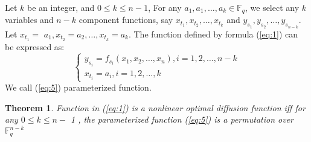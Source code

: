 \documentclass[12pt,a4paper]{article}
\newcommand{\0}{\textbf{0}}
\newcommand{\1}{\textbf{1}}
\newtheorem{theorem}{Theorem}
\begin{document}
    Let $k$ be an integer, and $0 \leq k \leq n-1$, For any $a_{1}, a_{1}, \dots, a_{k} \in \mathbb{F}_{q}$, we select any $k$ variables and $n-k$ component functions, 
    say $x_{t_{1}}, x_{t_{2}}, \dots, x_{t_{k}}$ and $y_{s_{1}}, y_{s_{2}}, \dots, y_{s_{n-k}}$. 
    Let $x_{t_{1}}=$ $a_{1}, x_{t_{2}}=a_{2}, \dots, x_{t_{k}}=a_{k}$. 
    The function defined by formula (\ref{eq:1}) can be expressed as:
    \begin{equation}\label{eq:5}
        \left\{\begin{array}{c}
            y_{s_{i}}=f_{s_{i}}\left(x_{1}, x_{2}, \dots, x_{n}\right), i=1,2, \dots, n-k \\
            x_{t_{i}}=a_{i}, i=1,2, \dots, k
        \end{array}\right.
    \end{equation}
    We call (\ref{eq:5}) parameterized function.
    \begin{theorem}
        Function in (\ref{eq:1}) is a nonlinear optimal diffusion function iff for any $0 \leq k \leq n-$ 1 , the parameterized function (\ref{eq:5}) is a permutation over $\mathbb{F}_{q}^{n-k}$
    \end{theorem}
\end{document}
